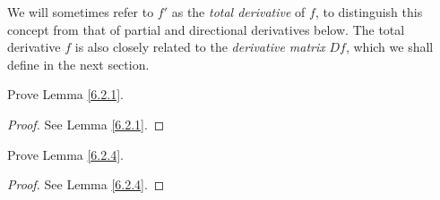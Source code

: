\begin{note}
    We will sometimes refer to \(f'\) as the \emph{total derivative} of \(f\), to distinguish this concept from that of partial and directional derivatives below.
    The total derivative \(f\) is also closely related to the \emph{derivative matrix} \(Df\),
    which we shall define in the next section.
\end{note}

\exercisesection

\begin{exercise}\label{ex 6.2.1}
    Prove Lemma \ref{6.2.1}.
\end{exercise}

\begin{proof}
    See Lemma \ref{6.2.1}.
\end{proof}

\begin{exercise}\label{ex 6.2.2}
    Prove Lemma \ref{6.2.4}.
\end{exercise}

\begin{proof}
    See Lemma \ref{6.2.4}.
\end{proof}